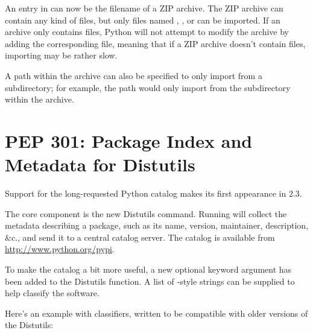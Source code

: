\documentclass{howto}
\begin{document}
An entry in  can now be the filename of a ZIP archive.
The ZIP archive can contain any kind of files, but only files named
, , or  can be imported.  If an
archive only contains  files, Python will not attempt to
modify the archive by adding the corresponding  file, meaning
that if a ZIP archive doesn't contain  files, importing may be
rather slow.

A path within the archive can also be specified to only import from a
subdirectory; for example, the path 
would only import from the  subdirectory within the
archive.

\begin{seealso}


\end{seealso}

\section{PEP 301: Package Index and Metadata for
Distutils\label{section-pep301}}

Support for the long-requested Python catalog makes its first
appearance in 2.3.

The core component is the new Distutils  command.
Running  will collect the metadata
describing a package, such as its name, version, maintainer,
description, \&c., and send it to a central catalog server.  The
catalog is available from \url{http://www.python.org/pypi}.

To make the catalog a bit more useful, a new optional
 keyword argument has been added to the Distutils
 function.  A list of
-style
strings can be supplied to help classify the software.

Here's an example  with classifiers, written to be compatible 
with older versions of the Distutils:
\end{document}
